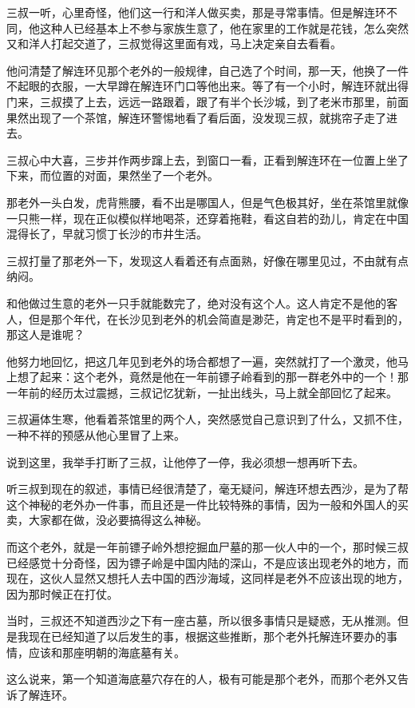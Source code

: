 三叔一听，心里奇怪，他们这一行和洋人做买卖，那是寻常事情。但是解连环不同，他这种人已经基本上不参与家族生意了，他在家里的工作就是花钱，怎么突然又和洋人打起交道了，三叔觉得这里面有戏，马上决定亲自去看看。

他问清楚了解连环见那个老外的一般规律，自己选了个时间，那一天，他换了一件不起眼的衣服，一大早蹲在解连环门口等他出来。等了有一个小时，解连环就出得门来，三叔摸了上去，远远一路跟着，跟了有半个长沙城，到了老米市那里，前面果然出现了一个茶馆，解连环警惕地看了看后面，没发现三叔，就挑帘子走了进去。

三叔心中大喜，三步并作两步蹿上去，到窗口一看，正看到解连环在一位置上坐了下来，而位置的对面，果然坐了一个老外。

那老外一头白发，虎背熊腰，看不出是哪国人，但是气色极其好，坐在茶馆里就像一只熊一样，现在正似模似样地喝茶，还穿着拖鞋，看这自若的劲儿，肯定在中国混得长了，早就习惯丁长沙的市井生活。

三叔打量了那老外一下，发现这人看着还有点面熟，好像在哪里见过，不由就有点纳闷。

和他做过生意的老外一只手就能数完了，绝对没有这个人。这人肯定不是他的客人，但是那个年代，在长沙见到老外的机会简直是渺茫，肯定也不是平时看到的，那这人是谁呢？

他努力地回忆，把这几年见到老外的场合都想了一遍，突然就打了一个激灵，他马上想了起来：这个老外，竟然是他在一年前镖子岭看到的那一群老外中的一个！那一年前的经历太过震撼，三叔记忆犹新，一扯出线头，马上就全部回忆了起来。

三叔遍体生寒，他看着茶馆里的两个人，突然感觉自己意识到了什么，又抓不住，一种不祥的预感从他心里冒了上来。

说到这里，我举手打断了三叔，让他停了一停，我必须想一想再听下去。

听三叔到现在的叙述，事情已经很清楚了，毫无疑问，解连环想去西沙，是为了帮这个神秘的老外办一件事，而且还是一件比较特殊的事情，因为一般和外国人的买卖，大家都在做，没必要搞得这么神秘。

而这个老外，就是一年前镖子岭外想挖掘血尸墓的那一伙人中的一个，那时候三叔已经感觉十分奇怪，因为镖子岭是中国内陆的深山，不是应该出现老外的地方，而现在，这伙人显然又想托人去中国的西沙海域，这同样是老外不应该出现的地方，因为那时候正在打仗。

当时，三叔还不知道西沙之下有一座古墓，所以很多事情只是疑惑，无从推测。但是我现在已经知道了以后发生的事，根据这些推断，那个老外托解连环要办的事情，应该和那座明朝的海底墓有关。

这么说来，第一个知道海底墓穴存在的人，极有可能是那个老外，而那个老外又告诉了解连环。

